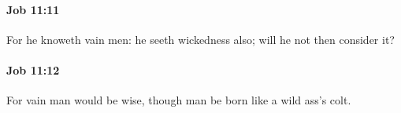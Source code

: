 		\paragraph{Job 11:11} %
			\label{JOB-11-11}

			For he knoweth vain men: he seeth wickedness also; will he not then consider it?


		\paragraph{Job 11:12} %
			\label{JOB-11-12}

			For vain man would be wise, though man be born like a wild ass’s colt.


